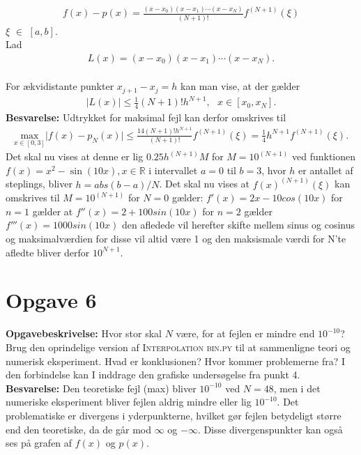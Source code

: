 \begin{align*}
f(x)-p(x) = \frac{(x-x_0)(x-x_1)\cdots(x-x_N)}{(N+1)!}f^{(N+1)}(\xi)
\end{align*}
 $\xi$ $\in$ $\left [a,b \right ]$.
\\
Lad
\begin{align*}
L(x)=(x-x_0)(x-x_1)\cdots(x-x_N).
\end{align*}
\\
For ækvidistante punkter $x_{j+1} - x_j = h$ kan man vise, at der gælder
\begin{align*}
\lvert L(x) \rvert \leq \frac{1}{4}(N+1)!h^{N+1}, \text{   } x \in \left [x_0, x_N \right ].
\end{align*}
\textbf{Besvarelse:} 
Udtrykket for maksimal fejl kan derfor omskrives til
\begin{align*}
\underset{x \in \left [0,3 \right ]}{\text{max}} \lvert f(x)-p_N(x) \rvert \leq \frac{{1}{4}(N+1)!h^{N+1}}{(N+1)!}f^{(N+1)}(\xi)=\frac{1}{4}h^{N+1}f^{(N+1)}(\xi).
\end{align*}
Det skal nu vises at denne er lig  $0.25h^{(N+1)}M$ for $M=10^{(N+1)}$ ved funktionen $f(x)=x^2-\sin(10x), x \in \mathbb{R}$ i intervallet $a=0$ til $b=3$, hvor $h$ er antallet af steplings, bliver $h=abs(b-a)/N$. 
Det skal nu vises at $f(x)^{(N+1)}(\xi)$ kan omskrives til $M=10^{(N+1)}$
for $N=0$ gælder: $f'(x)=2x-10cos(10x)$ for $n=1$ gælder at $f''(x)=2+100sin(10x)$ for $n=2$ gælder $f'''(x)=1000sin(10x)$ den afledede vil herefter skifte mellem sinus og cosinus og maksimalværdien for disse vil altid være 1 og den maksismale værdi for N'te afledte bliver derfor $10^{N+1}$.
\\
\section*{Opgave 6}
\textbf{Opgavebeskrivelse:} Hvor stor skal $N$ være, for at fejlen er mindre end $10^{-10}$? 
Brug den oprindelige version af \textsc{Interpolation bin.py} til at sammenligne teori og numerisk eksperiment. 
Hvad er konklusionen? 
Hvor kommer problemerne fra? 
I den forbindelse kan I inddrage den grafiske undersøgelse fra punkt 4.
\\
\textbf{Besvarelse:} Den teoretiske fejl (max) bliver $10^{-10}$ ved $N=48$, men i det numeriske eksperiment bliver fejlen aldrig mindre eller lig $10^{-10}$. Det problematiske er divergens i yderpunkterne, hvilket gør fejlen betydeligt større end den teoretiske, da de går mod $ \infty $ og $ - \infty $. Disse divergenspunkter kan også ses på grafen af $f(x)$ og $p(x)$. 
%
